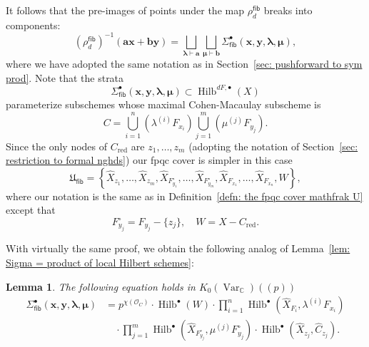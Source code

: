\documentclass[12pt]{amsart}
\newtheorem{lemma}[theorem]{Lemma}
\theoremstyle{definition}
\newcommand{\CC} {\mathbb{C}}          %
\renewcommand{\O}{\mathcal{O}}
\newcommand{\Hilb}{\operatorname{Hilb}}
\newcommand{\Var}{\operatorname{Var}}
\newcommand{\boldx}{\boldsymbol{x}}
\newcommand{\boldy}{\boldsymbol{y}}
\newcommand{\bolda}{\boldsymbol{a}}
\newcommand{\boldb}{\boldsymbol{b}}
\newcommand{\boldlambda}{\boldsymbol{\lambda }}
\newcommand{\boldmu}{\boldsymbol{\mu }}
\renewcommand{\hat}{\widehat}
\newcommand{\Xhat}{\widehat{X}}
\newcommand{\fiber}{\mathsf{fib}}
\newcommand{\red}{\mathrm{red}}
\begin{document}
It follows that the pre-images of points under the map
$\rho^{\fiber}_{d}$ breaks into components:
\[
\left(\rho_{d}^{\fiber} \right)^{-1}(\bolda \boldx +\boldb \boldy ) =
\bigsqcup_{\boldlambda \vdash \bolda} \bigsqcup_{\boldmu \vdash
\boldb} \Sigma^{\bullet}_{\fiber}(\boldx ,\boldy ,\boldlambda ,\boldmu ),
\]
where we have adopted the same notation as in Section~\ref{sec:
pushforward to sym prod}. Note that the strata
\[
 \Sigma^{\bullet}_{\fiber}(\boldx ,\boldy ,\boldlambda ,\boldmu )
 \subset \Hilb^{dF, \bullet}(X)
\]
parameterize subschemes whose maximal Cohen-Macaulay subscheme is 
\[
C = \bigcup_{i=1}^{n}\left(\lambda^{(i)}F_{x_{i}} \right)
\bigcup_{j=1}^{m}\left(\mu^{(j)}F_{y_{j}} \right) . 
\]
Since the only nodes of $C_{\red}$ are $z_{1},\dotsc ,z_{m}$ (adopting
the notation of Section~\ref{sec: restriction to formal nghds}) our
fpqc cover is simpler in this case
\[
\mathfrak{U}_{\fiber} =\left\{ \Xhat_{z_{1}},\dotsc ,
\Xhat_{z_{m}},\Xhat_{F^{\circ}_{y_{1}}},\dotsc ,
\Xhat_{F^{\circ}_{y_{m}}}, \Xhat_{F_{x_{1}}},\dotsc ,
\Xhat_{F_{x_{n}}}, W   \right\},
\]
where our notation is the same as in Definition~\ref{defn: the fpqc
cover mathfrak U} except that
\[
F^{\circ}_{y_{j}} = F_{y_{j}} - \{z_{j} \}, \quad W = X - C_{\red}. 
\]

With virtually the same proof, we obtain the following analog of
Lemma~\ref{lem: Sigma = product of local Hilbert schemes}:
\begin{lemma}\label{lem: Sigmafiber = product of local Hilbert schemes}
The following equation holds in $K_{0}(\Var_{\CC})(\!(p)\!)$
\begin{align*}
\Sigma^{\bullet}_{\fiber}(\boldx ,\boldy ,\boldlambda ,\boldmu ) &=
p^{\chi (\O_{C})}\cdot \Hilb^{\bullet}(W) \cdot \prod_{i=1}^{n}
\Hilb^{\bullet} \left(\Xhat_{F_{i}},\lambda^{(i)}F_{x_{i}} \right) \\
&\quad \cdot \prod_{j=1}^{m} \Hilb^{\bullet}
\left(\Xhat_{F^{\circ}_{y_{j}}}, \mu^{(j)} F^{\circ}_{y_{j}} \right)
\cdot \Hilb^{\bullet}\left( \Xhat_{z_{j}}, \hat{C}_{z_{j}} \right). 
\end{align*}
\end{lemma}
\end{document}
